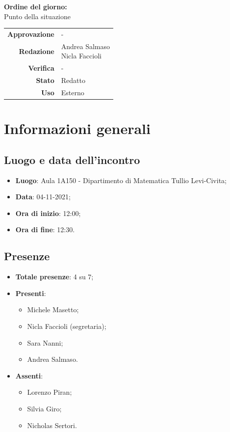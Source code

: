 \documentclass[11pt]{article}
\begin{document}
\begin{titlepage}
\begin{center}
			\large
			
			\vfill
			\textbf{Ordine del giorno:} \\
			Punto della situazione
			\vfill
			
			\begin{tabular}{r|l}
				\textbf{Approvazione} &  -\\
				\textbf{Redazione} &  \parbox[t]{3.5cm}{Andrea Salmaso \\Nicla Faccioli}\\
				\textbf{Verifica} &  -\\
				\textbf{Stato} & Redatto \\
				\textbf{Uso} & Esterno
			\end{tabular}
			\vfill
			
		\end{center}
	\end{titlepage}

	\newpage

	\section{Informazioni generali}
	\subsection{Luogo e data dell'incontro}
	\begin{itemize}
		\item \textbf{Luogo}: Aula 1A150 - Dipartimento di Matematica Tullio Levi-Civita;
		\item \textbf{Data}: 04-11-2021;
		\item \textbf{Ora di inizio}: 12:00;
		\item \textbf{Ora di fine}: 12:30.
	\end{itemize}
	
	\subsection{Presenze}
	\begin{itemize}
		\item \textbf{Totale presenze}: 4 su 7;
		\item \textbf{Presenti}:
		\begin{itemize}  
			\item Michele Masetto;
			\item Nicla Faccioli (segretaria);
			\item Sara Nanni;
			\item Andrea Salmaso.
		\end{itemize}
		\item \textbf{Assenti}:
			\begin{itemize}
				\item Lorenzo Piran;
				\item Silvia Giro;
				\item Nicholas Sertori.
			\end{itemize}
	\end{itemize}
\end{document}
